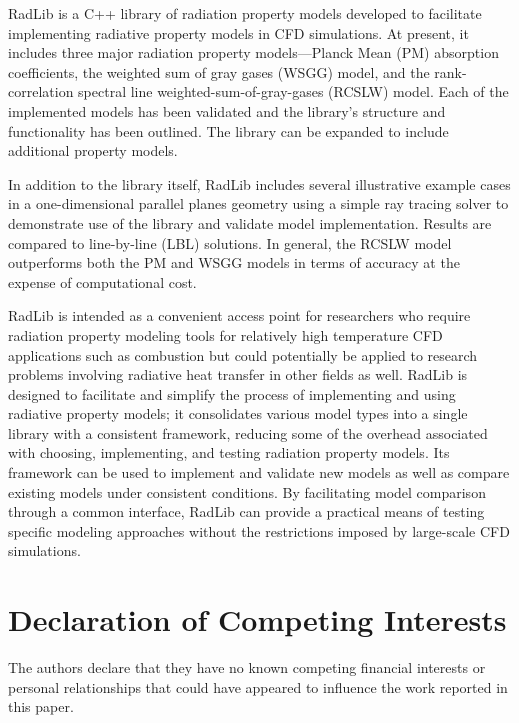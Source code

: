 \documentclass[preprint,12pt]{elsarticle}
\begin{document}
RadLib is a C++ library of radiation property models developed to facilitate implementing radiative property models in CFD simulations. At present, it includes three major radiation property models---Planck Mean (PM) absorption coefficients, the weighted sum of gray gases (WSGG) model, and the rank-correlation spectral line weighted-sum-of-gray-gases (RCSLW) model. Each of the implemented models has been validated and the library's structure and functionality has been outlined. The library can be expanded to include additional property models.

In addition to the library itself, RadLib includes several illustrative example cases in a one-dimensional parallel planes geometry using a simple ray tracing solver to demonstrate use of the library and validate model implementation. Results are compared to line-by-line (LBL) solutions. In general, the RCSLW model outperforms both the PM and WSGG models in terms of accuracy at the expense of computational cost.

RadLib is intended as a convenient access point for researchers who require radiation property modeling tools for relatively high temperature CFD applications such as combustion but could potentially be applied to research problems involving radiative heat transfer in other fields as well. RadLib is designed to facilitate and simplify the process of implementing and using radiative property models; it consolidates various model types into a single library with a consistent framework, reducing some of the overhead associated with choosing, implementing, and testing radiation property models. Its framework can be used to implement and validate new models as well as compare existing models under consistent conditions. By facilitating model comparison through a common interface, RadLib can provide a practical means of testing specific modeling approaches without the restrictions imposed by large-scale CFD simulations.



\section{Declaration of Competing Interests} \label{s:coi}

The authors declare that they have no known competing financial interests or personal relationships that could have appeared to influence the work reported in this paper.
\end{document}
